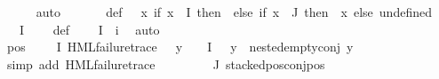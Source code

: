 \begin{isabellebody}
\ \ \ \ \isamarkupfalse%
\ auto\isanewline
\ \ \isamarkupfalse%
\ {\isasymPsi}\ \ \ {\isasymPsi}{\isacharunderscore}{\kern0pt}def{\isacharcolon}{\kern0pt}\ {\isachardoublequoteopen}{\isasymPsi}\ {\isacharequal}{\kern0pt}\ {\isacharparenleft}{\kern0pt}{\isasymlambda}x{\isachardot}{\kern0pt}\ if\ x\ {\isasymin}\ I\ then\ {\isasympsi}\ else\ {\isacharparenleft}{\kern0pt}if\ x\ {\isasymin}\ J\ then\ {\isasymPhi}\ x\ else\ undefined{\isacharparenright}{\kern0pt}{\isacharparenright}{\kern0pt}{\isachardoublequoteclose}\isanewline
\ \ \isamarkupfalse%
\ {\isachardoublequoteopen}{\isasymPsi}\ {\isacharbackquote}{\kern0pt}\ I\ {\isacharequal}{\kern0pt}\ {\isacharbraceleft}{\kern0pt}{\isasympsi}{\isacharbraceright}{\kern0pt}{\isachardoublequoteclose}\ \isamarkupfalse%
\ {\isasymPsi}{\isacharunderscore}{\kern0pt}def\ \isamarkupfalse%
\ {\isacartoucheopen}{\isasymPhi}\ {\isacharbackquote}{\kern0pt}\ I\ {\isacharequal}{\kern0pt}\ {\isacharbraceleft}{\kern0pt}i{\isacharbraceright}{\kern0pt}{\isacartoucheclose}\ \isamarkupfalse%
\ auto\isanewline
\ \ \isamarkupfalse%
\ pos{\isacharcolon}{\kern0pt}\ {\isachardoublequoteopen}{\isacharparenleft}{\kern0pt}{\isasymexists}{\isasympsi}\ {\isasymin}\ {\isacharparenleft}{\kern0pt}{\isasymPsi}\ {\isacharbackquote}{\kern0pt}\ I{\isacharparenright}{\kern0pt}{\isachardot}{\kern0pt}\ {\isacharparenleft}{\kern0pt}HML{\isacharunderscore}{\kern0pt}failure{\isacharunderscore}{\kern0pt}trace\ {\isasympsi}{\isacharparenright}{\kern0pt}\ {\isasymand}\ {\isacharparenleft}{\kern0pt}{\isasymforall}y\ {\isasymin}\ {\isacharparenleft}{\kern0pt}{\isasymPsi}\ {\isacharbackquote}{\kern0pt}\ I{\isacharparenright}{\kern0pt}{\isachardot}{\kern0pt}\ {\isasympsi}\ {\isasymnoteq}\ y\ {\isasymlongrightarrow}\ nested{\isacharunderscore}{\kern0pt}empty{\isacharunderscore}{\kern0pt}conj\ y{\isacharparenright}{\kern0pt}{\isacharparenright}{\kern0pt}{\isachardoublequoteclose}\isanewline
\ \ \ \ \isamarkupfalse%
\ {\isacharparenleft}{\kern0pt}simp\ add{\isacharcolon}{\kern0pt}\ {\isacartoucheopen}HML{\isacharunderscore}{\kern0pt}failure{\isacharunderscore}{\kern0pt}trace\ {\isasympsi}{\isacartoucheclose}{\isacharparenright}{\kern0pt}\isanewline
\ \ \isamarkupfalse%
\ {\isachardoublequoteopen}{\isasymforall}{\isasympsi}\ {\isasymin}\ {\isasymPsi}\ {\isacharbackquote}{\kern0pt}\ J{\isachardot}{\kern0pt}\ stacked{\isacharunderscore}{\kern0pt}pos{\isacharunderscore}{\kern0pt}conj{\isacharunderscore}{\kern0pt}pos\ {\isasympsi}{\isachardoublequoteclose}\isanewline

\end{isabellebody}
